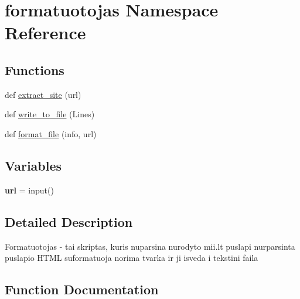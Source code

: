 \hypertarget{namespaceformatuotojas}{}\section{formatuotojas Namespace Reference}
\label{namespaceformatuotojas}
\subsection*{Functions}
\begin{DoxyCompactItemize}
\item 
def \mbox{\hyperlink{namespaceformatuotojas_adb6483a5f4a0e88c4da5076c2787e7ad}{extract\+\_\+site}} (url)
\item 
def \mbox{\hyperlink{namespaceformatuotojas_a05a9688bfbecdf2e3fa1ad7a2b9158c3}{write\+\_\+to\+\_\+file}} (Lines)
\item 
def \mbox{\hyperlink{namespaceformatuotojas_a543e7e6d2cd2505fee71c2d8b1552ffd}{format\+\_\+file}} (info, url)
\end{DoxyCompactItemize}
\subsection*{Variables}
\begin{DoxyCompactItemize}
\item 
\mbox{\label{namespaceformatuotojas_a7d88bd9d1c9f4446e5bca414b6d3faa6}} 
{\bfseries url} = input()
\end{DoxyCompactItemize}


\subsection{Detailed Description}
\begin{DoxyVerb}Formatuotojas - tai skriptas, kuris nuparsina nurodyto mii.lt puslapi
nurparsinta puslapio HTML suformatuoja norima tvarka ir ji isveda i tekstini faila
\end{DoxyVerb}
 

\subsection{Function Documentation}
\mbox{\label{namespaceformatuotojas_adb6483a5f4a0e88c4da5076c2787e7ad}} 
